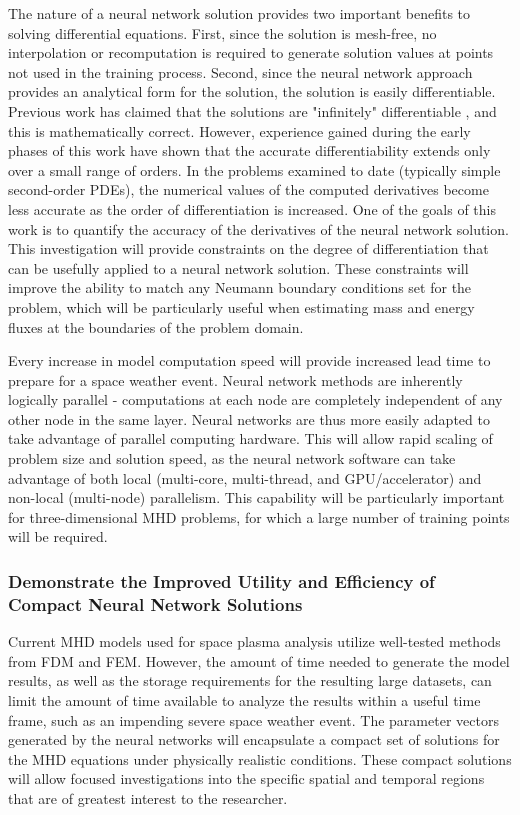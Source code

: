 \documentclass{article}
\begin{document}
The nature of a neural network solution provides two important benefits to solving differential equations. First, since the solution is mesh-free, no interpolation or recomputation is required to generate solution values at points not used in the training process. Second, since the neural network approach provides an analytical form for the solution, the solution is easily differentiable. Previous work has claimed that the solutions are "infinitely" differentiable \cite{Lagaris1998}, and this is mathematically correct. However, experience gained during the early phases of this work have shown that the accurate differentiability extends only over a small range of orders. In the problems examined to date (typically simple second-order PDEs), the numerical values of the computed  derivatives become less accurate as the order of differentiation is increased. One of the goals of this work is to quantify the accuracy of the derivatives of the neural network solution. This investigation will provide constraints on the degree of differentiation that can be usefully applied to a neural network solution. These constraints will improve the ability to match any Neumann boundary conditions set for the problem, which will be particularly useful when estimating mass and energy fluxes at the boundaries of the problem domain.

Every increase in model computation speed will provide increased lead time to prepare for a space weather event. Neural network methods are inherently logically parallel - computations at each node are completely independent of any other node in the same layer. Neural networks are thus more easily adapted to take advantage of parallel computing hardware. This will allow rapid scaling of problem size and solution speed, as the neural network software can take advantage of both local (multi-core, multi-thread, and GPU/accelerator) and non-local (multi-node) parallelism. This capability will be particularly important for three-dimensional MHD problems, for which a large number of training points will be required.

\subsubsection{Demonstrate the Improved Utility and Efficiency of Compact Neural Network Solutions}

Current MHD models used for space plasma analysis utilize well-tested methods from FDM and FEM. However, the amount of time needed to generate the model results, as well as the storage requirements for the resulting large datasets, can limit the amount of time available to analyze the results within a useful time frame, such as an impending severe space weather event. The parameter vectors generated by the neural networks will encapsulate a compact set of solutions for the MHD equations under physically realistic conditions. These compact solutions will allow focused investigations into the specific spatial and temporal regions that are of greatest interest to the researcher.
 
\end{document}
